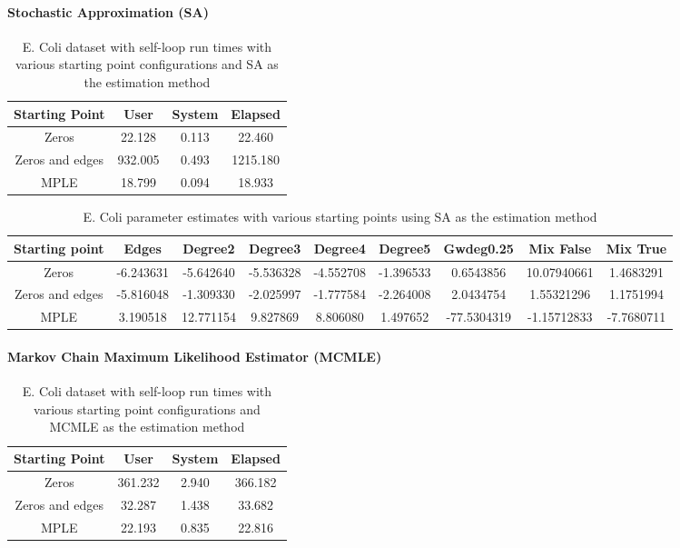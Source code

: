 \paragraph{Stochastic Approximation (SA)}

\begin{table}[H]
\centering
\begin{tabular}{|| c | c | c | c||}
 \hline
 Starting Point & User & System & Elapsed \\
 \hline
 Zeros & 22.128 & 0.113 & 22.460 \\
 \hline
 Zeros and edges & 932.005 & 0.493 & 1215.180 \\ 
 \hline
 MPLE & 18.799 & 0.094 & 18.933 \\ 
 \hline
 \end{tabular}
 \label{t:ecoli2_sa}
 \caption{E. Coli dataset with self-loop run times with various starting point configurations and SA as the estimation method}
\end{table}


\begin{table}[H]
\scriptsize
\centering
\begin{tabular}{|| c | c | c | c | c | c | c | c | c ||}
\hline
Starting point & Edges & Degree2 & Degree3 & Degree4 & Degree5 & Gwdeg0.25 & Mix False & Mix True \\
\hline
Zeros & -6.243631 & -5.642640 & -5.536328 & -4.552708 & -1.396533 & 0.6543856 & 10.07940661 & 1.4683291 \\
\hline
Zeros and edges & -5.816048 & -1.309330 & -2.025997 & -1.777584 & -2.264008 & 2.0434754 & 1.55321296 & 1.1751994 \\
\hline
MPLE & 3.190518	& 12.771154 & 9.827869 & 8.806080 & 1.497652 & -77.5304319 & -1.15712833 &-7.7680711 \\
\hline
\end{tabular}
\label{t2:params_ecoli_sa}
\caption{E. Coli parameter estimates with various starting points using SA as the estimation method}
\end{table}

\paragraph{Markov Chain Maximum Likelihood Estimator (MCMLE)}

\begin{table}[H]
\centering
\begin{tabular}{|| c | c | c | c||}
 \hline
 Starting Point & User & System & Elapsed \\ 
 \hline
 Zeros & 361.232 & 2.940 & 366.182 \\  
 \hline
 Zeros and edges & 32.287 & 1.438 & 33.682 \\ 
 \hline
 MPLE & 22.193 & 0.835 & 22.816 \\  
 \hline
\end{tabular}
\label{t:ecoli2}
\caption{E. Coli dataset with self-loop run times with various starting point configurations and MCMLE as the estimation method}
\end{table}

